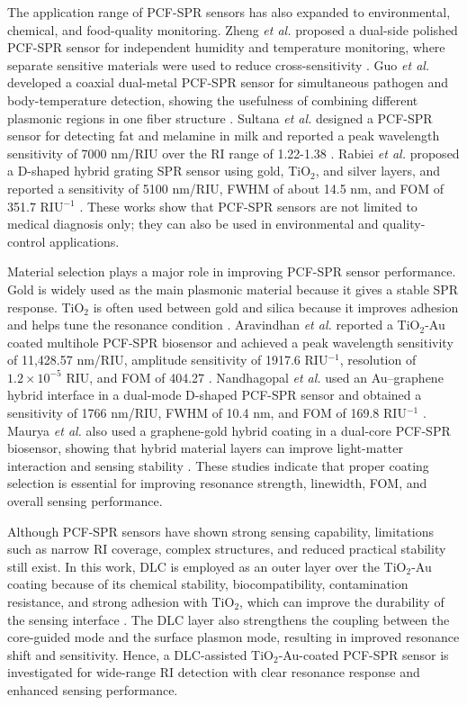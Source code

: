 \documentclass[preprint,12pt]{elsarticle}
\begin{document}
The application range of PCF-SPR sensors has also expanded to environmental, chemical, and food-quality monitoring. Zheng \emph{et al.} proposed a dual-side polished PCF-SPR sensor for independent humidity and temperature monitoring, where separate sensitive materials were used to reduce cross-sensitivity \cite{zheng2026high}. Guo \emph{et al.} developed a coaxial dual-metal PCF-SPR sensor for simultaneous pathogen and body-temperature detection, showing the usefulness of combining different plasmonic regions in one fiber structure \cite{guo2026dual}. Sultana \emph{et al.} designed a PCF-SPR sensor for detecting fat and melamine in milk and reported a peak wavelength sensitivity of 7000 nm/RIU over the RI range of 1.22-1.38 \cite{sultana2026design}. Rabiei \emph{et al.} proposed a D-shaped hybrid grating SPR sensor using gold, TiO$_2$, and silver layers, and reported a sensitivity of 5100 nm/RIU, FWHM of about 14.5 nm, and FOM of 351.7 RIU$^{-1}$ \cite{rabiei2026high}. These works show that PCF-SPR sensors are not limited to medical diagnosis only; they can also be used in environmental and quality-control applications.

Material selection plays a major role in improving PCF-SPR sensor performance. Gold is widely used as the main plasmonic material because it gives a stable SPR response. TiO$_2$ is often used between gold and silica because it improves adhesion and helps tune the resonance condition \cite{ashrafian2025highly,guo2025dual,azadi2025ultrahigh,jamil2025gold}. Aravindhan \emph{et al.} reported a TiO$_2$-Au coated multihole PCF-SPR biosensor and achieved a peak wavelength sensitivity of 11,428.57 nm/RIU, amplitude sensitivity of 1917.6 RIU$^{-1}$, resolution of $1.2 \times 10^{-5}$ RIU, and FOM of 404.27 \cite{aravindhan2026design}. Nandhagopal \emph{et al.} used an Au--graphene hybrid interface in a dual-mode D-shaped PCF-SPR sensor and obtained a sensitivity of 1766 nm/RIU, FWHM of 10.4 nm, and FOM of 169.8 RIU$^{-1}$ \cite{nandhagopal2026highly}. Maurya \emph{et al.} also used a graphene-gold hybrid coating in a dual-core PCF-SPR biosensor, showing that hybrid material layers can improve light-matter interaction and sensing stability \cite{maurya2026ultra}. These studies indicate that proper coating selection is essential for improving resonance strength, linewidth, FOM, and overall sensing performance.

Although PCF-SPR sensors have shown strong sensing capability, limitations such as narrow RI coverage, complex structures, and reduced practical stability still exist. In this work, DLC is employed as an outer layer over the TiO$_2$-Au coating because of its chemical stability, biocompatibility, contamination resistance, and strong adhesion with TiO$_2$, which can improve the durability of the sensing interface \cite{paul2025dlc}. The DLC layer also strengthens the coupling between the core-guided mode and the surface plasmon mode, resulting in improved resonance shift and sensitivity. Hence, a DLC-assisted TiO$_2$-Au-coated PCF-SPR sensor is investigated for wide-range RI detection with clear resonance response and enhanced sensing performance.
\end{document}
